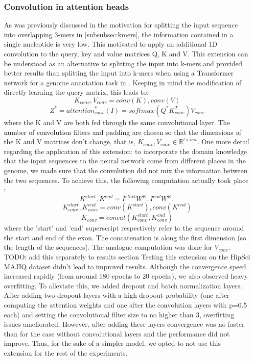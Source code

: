 \subsubsection{Convolution in attention heads} \label{subsubsec:attention_conv}
As was previously discussed in the motivation for splitting the input sequence into overlapping 3-mers in \ref{subsubsec:kmers}, the information contained in a single nucleotide is very low. This motivated \cite{ghentransformers} to apply an additional 1D convolution to the query, key and value matrices Q, K and V. This extension can be understood as an alternative to splitting the input into k-mers and provided better results than splitting the input into k-mers when using a Transformer network for a genome annotation task in \cite{ghentransformers}.
Keeping in mind the modification of directly learning the query matrix, this leads to:
$$K_{conv}, V_{conv} = conv(K), conv(V)$$
$$Z^* = {attention}_{conv}^*(I) = softmax({Q}^*K_{conv}^T)V_{conv}$$
where the K and V are both fed through the same convolutional layer.
The number of convolution filters and padding are chosen so that the dimensions of the K and V matrices don't change, that is, $K_{conv}, V_{conv} \in \mathbb{R}^{l \times out}$.
One more detail regarding the application of this extension: to incorporate the domain knowledge that the input sequences to the neural network come from different places in the genome, we made sure that the convolution did not mix the information between the two sequences. To achieve this, the following computation actually took place :
$$K^{start}, K^{end} = I^{start}W^K, I^{end}W^K,$$
$$K^{start}_{conv}, K^{end}_{conv} = conv(K^{start}), conv(K^{end})$$
$$K_{conv} = concat(K^{start}_{conv}, K^{end}_{conv})$$
where the 'start' and 'end' superscript respectively refer to the sequence around the start and end of the exon. The concatenation is along the first dimension (so the length of the sequences). The analogue computation was done for $V_{conv}$.\\
TODO: add this separately to results section
Testing this extension on the HipSci MAJIQ dataset didn't lead to improved results. Although the convergence speed increased rapidly (from around 180 epochs to 20 epochs), we also observed heavy overfitting. To alleviate this, we added dropout and batch normalization layers. After adding two dropout layers with a high dropout probability (one after computing the attention weights and one after the convolution layers with p=0.5 each) and setting the convolutional filter size to no higher than 3, overfitting issues ameliorated. However, after adding these layers convergence was no faster than for the case without convolutional layers and the performance did not improve. Thus, for the sake of a simpler model, we opted to not use this extension for the rest of the experiments.
